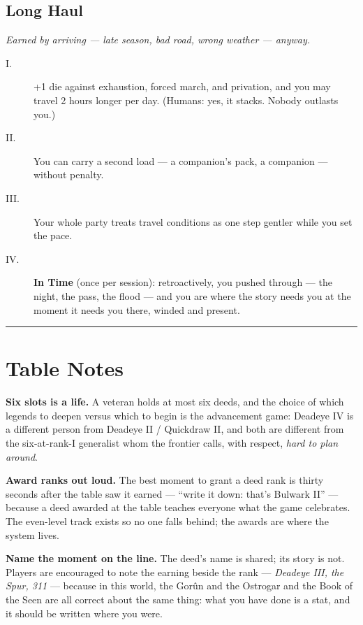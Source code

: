 \subsection{Long Haul}
\textit{Earned by arriving --- late season, bad road, wrong weather --- anyway.}
\begin{description}
    \item[I.] +1 die against exhaustion, forced march, and privation, and you may travel 2 hours longer per day. (Humans: yes, it stacks. Nobody outlasts you.)
    \item[II.] You can carry a second load --- a companion's pack, a companion --- without penalty.
    \item[III.] Your whole party treats travel conditions as one step gentler while you set the pace.
    \item[IV.] \textbf{In Time} (once per session): retroactively, you pushed through --- the night, the pass, the flood --- and you are where the story needs you at the moment it needs you there, winded and present.
\end{description}

\medskip\hrule\medskip

\section{Table Notes}

\textbf{Six slots is a life.} A veteran holds at most six deeds, and the choice of which legends to deepen versus which to begin is the advancement game: Deadeye IV is a different person from Deadeye II / Quickdraw II, and both are different from the six-at-rank-I generalist whom the frontier calls, with respect, \textit{hard to plan around}.

\textbf{Award ranks out loud.} The best moment to grant a deed rank is thirty seconds after the table saw it earned --- ``write it down: that's Bulwark II'' --- because a deed awarded at the table teaches everyone what the game celebrates. The even-level track exists so no one falls behind; the awards are where the system lives.

\textbf{Name the moment on the line.} The deed's name is shared; its story is not. Players are encouraged to note the earning beside the rank --- \textit{Deadeye III, the Spur, 311} --- because in this world, the Gorûn and the Ostrogar and the Book of the Seen are all correct about the same thing: what you have done is a stat, and it should be written where you were.

